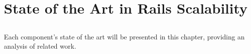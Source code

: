 \chapter{State of the Art in Rails Scalability} %
\label{cha:state_of_the_art}

\section*{} %
Each component's state of the art will be presented in this chapter, providing an analysis of related work.






